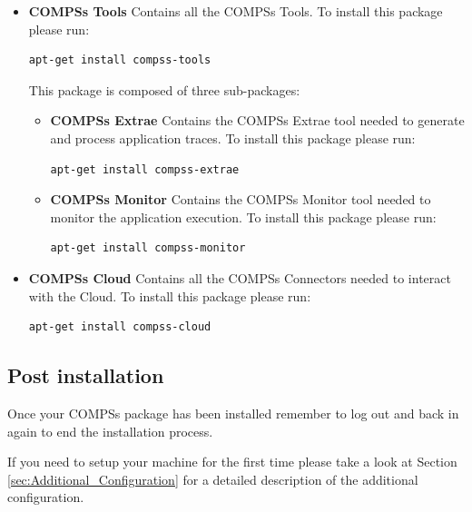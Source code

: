 \begin{itemize}
 \item \textbf{COMPSs Tools} \newline
       Contains all the COMPSs Tools.
       \newline
       To install this package please run:
       \begin{lstlisting}[language=bash]
	  apt-get install compss-tools
       \end{lstlisting}
       This package is composed of three sub-packages:
       \begin{itemize}
        \item \textbf{COMPSs Extrae} \newline
	      Contains the COMPSs Extrae tool needed to generate and process application traces.
	      \newline
	      To install this package please run:
	      \begin{lstlisting}[language=bash]
		  apt-get install compss-extrae
	      \end{lstlisting}
        \item \textbf{COMPSs Monitor} \newline
              Contains the COMPSs Monitor tool needed to monitor the application execution. 
              \newline
	      To install this package please run:
	      \begin{lstlisting}[language=bash]
		  apt-get install compss-monitor
	      \end{lstlisting}
       \end{itemize}

 \item \textbf{COMPSs Cloud} \newline
       Contains all the COMPSs Connectors needed to interact with the Cloud.
       \newline
       To install this package please run:
       \begin{lstlisting}[language=bash]
	  apt-get install compss-cloud
       \end{lstlisting}
\end{itemize} 

\subsection{Post installation}
Once your COMPSs package has been installed remember to log out and back in again to end the installation process.

If you need to setup your machine for the first time please take a look at Section \ref{sec:Additional_Configuration} for a 
detailed description of the additional configuration. 
